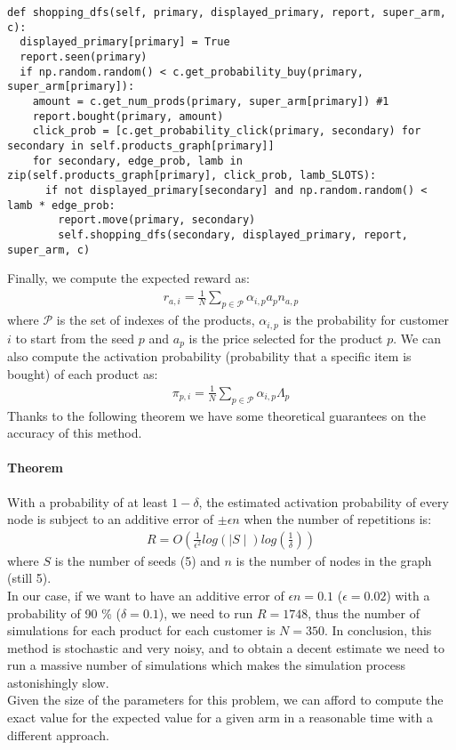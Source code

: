 \begin{verbatim}
def shopping_dfs(self, primary, displayed_primary, report, super_arm, c):
  displayed_primary[primary] = True
  report.seen(primary)
  if np.random.random() < c.get_probability_buy(primary, super_arm[primary]):
    amount = c.get_num_prods(primary, super_arm[primary]) #1
    report.bought(primary, amount)
    click_prob = [c.get_probability_click(primary, secondary) for secondary in self.products_graph[primary]]
    for secondary, edge_prob, lamb in zip(self.products_graph[primary], click_prob, lamb_SLOTS):
      if not displayed_primary[secondary] and np.random.random() < lamb * edge_prob:
        report.move(primary, secondary)
        self.shopping_dfs(secondary, displayed_primary, report, super_arm, c)
\end{verbatim}
Finally, we compute the expected reward as:
\begin{align*}
    r_{a, i} = \frac{1}{N}\sum_{p \in \mathcal{P}}\alpha_{i, p} a_{p} n_{a, p}
\end{align*}
where $\mathcal{P}$ is the set of indexes of the products, $\alpha_{i, p}$ is the probability for customer $i$ to start from the seed $p$ and $a_{p}$ is the price selected for the product $p$. We can also compute the activation probability (probability that a specific item is bought) of each product as:
\begin{align*}
    \pi_{p, i} = \frac{1}{N}\sum_{p \in \mathcal{P}}\alpha_{i, p} \Lambda_p
\end{align*}
Thanks to the following theorem we have some theoretical guarantees on the accuracy of this method.
\paragraph{Theorem}
With a probability of at least $1 - \delta$, the estimated activation probability of every node is subject to an additive error of $\pm \epsilon n$ when the number of repetitions is:
\begin{align*}
    R = O(\frac{1}{\epsilon^2}log(\mid S \mid)log(\frac{1}{\delta}))
\end{align*}
where $S$ is the number of seeds (5) and $n$ is the number of nodes in the graph (still 5).\\

In our case, if we want to have an additive error of $\epsilon n = 0.1$ ($\epsilon = 0.02$) with a probability of 90 \% ($\delta=0.1$), we need to run $R=1748$, thus the number of simulations for each product for each customer is $N=350$.
In conclusion, this method is stochastic and very noisy, and to obtain a decent estimate we need to run a massive number of simulations which makes the simulation process astonishingly slow.\\
Given the size of the parameters for this problem, we can afford to compute the exact value for the expected value for a given arm in a reasonable time with a different approach.

